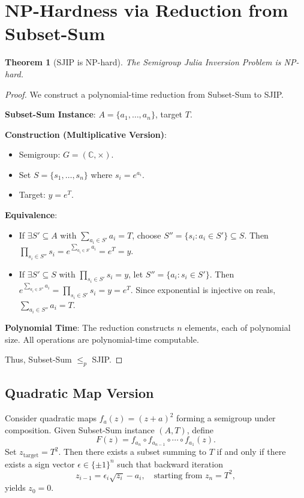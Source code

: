 \documentclass[12pt]{article}
\newtheorem{theorem}{Theorem}[section]
\begin{document}
\section{NP-Hardness via Reduction from Subset-Sum}
\begin{theorem}[SJIP is NP-hard]
    The Semigroup Julia Inversion Problem is NP-hard.
\end{theorem}
\begin{proof}
    We construct a polynomial-time reduction from Subset-Sum to SJIP.

    \textbf{Subset-Sum Instance}: $A = \{a_1, \dots, a_n\}$, target $T$.

    \textbf{Construction (Multiplicative Version)}:
    \begin{itemize}
        \item Semigroup: $G = (\mathbb{C}, \times)$.
        \item Set $S = \{s_1, \dots, s_n\}$ where $s_i = e^{a_i}$.
        \item Target: $y = e^T$.
    \end{itemize}

    \textbf{Equivalence}:
    \begin{itemize}
        \item[$\Rightarrow$] If $\exists S' \subseteq A$ with $\sum_{a_i \in S'} a_i = T$, choose $S'' = \{s_i : a_i \in S'\} \subseteq S$. Then $\prod_{s_i \in S''} s_i = e^{\sum_{a_i \in S'} a_i} = e^T = y$.
        \item[$\Leftarrow$] If $\exists S' \subseteq S$ with $\prod_{s_i \in S'} s_i = y$, let $S'' = \{a_i : s_i \in S'\}$. Then $e^{\sum_{a_i \in S''} a_i} = \prod_{s_i \in S'} s_i = y = e^T$. Since exponential is injective on reals, $\sum_{a_i \in S''} a_i = T$.
    \end{itemize}

    \textbf{Polynomial Time}: The reduction constructs $n$ elements, each of polynomial size. All operations are polynomial-time computable.

    Thus, Subset-Sum $\leq_p$ SJIP.
\end{proof}

\subsection{Quadratic Map Version}
Consider quadratic maps $f_a(z) = (z + a)^2$ forming a semigroup under composition. Given Subset-Sum instance $(A,T)$, define
\begin{equation}
    F(z) = f_{a_n} \circ f_{a_{n-1}} \circ \cdots \circ f_{a_1}(z).
\end{equation}
Set $z_{\text{target}} = T^2$. Then there exists a subset summing to $T$ if and only if there exists a sign vector $\epsilon \in \{\pm 1\}^n$ such that backward iteration
\begin{equation}
    z_{i-1} = \epsilon_i \sqrt{z_i} - a_i, \quad \text{starting from } z_n = T^2,
\end{equation}
yields $z_0 = 0$.
\end{document}
